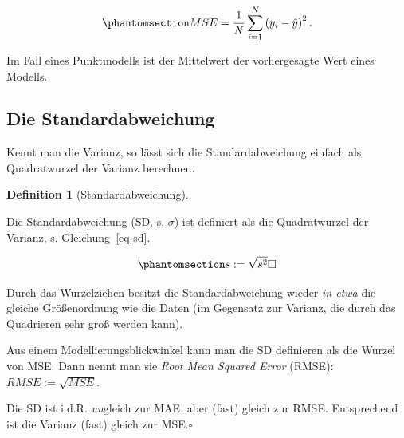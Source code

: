 \documentclass[
  a4paper,
]{scrbook}
\theoremstyle{definition}
\theoremstyle{definition}
\newtheorem{definition}{Definition}[chapter]
\theoremstyle{definition}
\theoremstyle{remark}
\begin{document}
\begin{equation}\phantomsection\label{eq-mse}{{\displaystyle MSE={\frac {1}{N}}\sum _{i=1}^{N}\left(y_{i}-{\hat {y}}\right)^{2}.}}\end{equation}

Im Fall eines Punktmodells ist der Mittelwert der vorhergesagte Wert
eines Modells.

\subsection{Die Standardabweichung}\label{die-standardabweichung}

Kennt man die Varianz, so lässt sich die Standardabweichung einfach als
Quadratwurzel der Varianz berechnen.

\begin{definition}[Standardabweichung]\protect\hypertarget{def-sd}{}\label{def-sd}

Die Standardabweichung (SD, s, \(\sigma\)) ist definiert als die
Quadratwurzel der Varianz, s. Gleichung~\ref{eq-sd}.

\begin{equation}\phantomsection\label{eq-sd}{s := \sqrt{s^2} \square}\end{equation}

\end{definition}

Durch das Wurzelziehen besitzt die Standardabweichung wieder \emph{in
etwa} die gleiche Größenordnung wie die Daten (im Gegensatz zur Varianz,
die durch das Quadrieren sehr groß werden kann).

Aus einem Modellierungsblickwinkel kann man die SD definieren als die
Wurzel von MSE. Dann nennt man sie \emph{Root Mean Squared Error}
(RMSE): \(RMSE := \sqrt{MSE}\).

\begin{tcolorbox}[enhanced jigsaw, colbacktitle=quarto-callout-note-color!10!white, bottomrule=.15mm, left=2mm, breakable, rightrule=.15mm, coltitle=black, title=\textcolor{quarto-callout-note-color}{\faInfo}\hspace{0.5em}{Hinweis}, colback=white, leftrule=.75mm, titlerule=0mm, opacityback=0, bottomtitle=1mm, toprule=.15mm, arc=.35mm, toptitle=1mm, opacitybacktitle=0.6, colframe=quarto-callout-note-color-frame]

Die SD ist i.d.R. \emph{un}gleich zur MAE, aber (fast) gleich zur RMSE.
Entsprechend ist die Varianz (fast) gleich zur MSE.\(\square\)

\end{tcolorbox}
\end{document}

